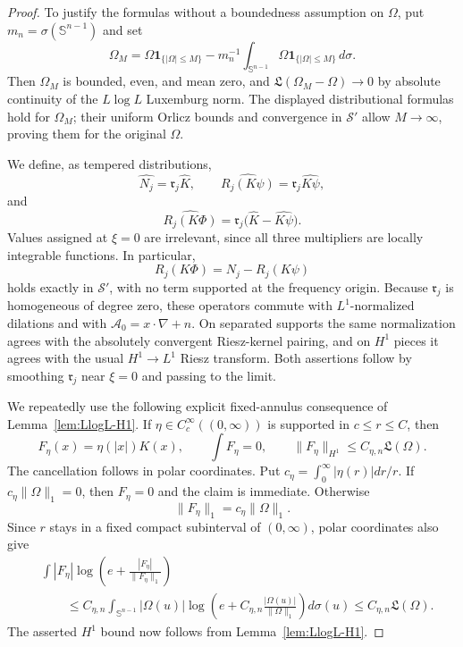\documentclass[11pt]{article}
\numberwithin{equation}{section}
\theoremstyle{remark}
\theoremstyle{definition}
\newcommand{\Sph}{\mathbb S}
\newcommand{\norm}[1]{\lVert #1\rVert}
\begin{document}
\begin{proof}
To justify the formulas without a boundedness assumption on $\Omega$, put
$m_n=\sigma(\Sph^{n-1})$ and set
\[
 \Omega_M=\Omega\mathbf1_{\{|\Omega|\le M\}}
 -m_n^{-1}\int_{\Sph^{n-1}}
       \Omega\mathbf1_{\{|\Omega|\le M\}}\,d\sigma.
\]
Then $\Omega_M$ is bounded, even, and mean zero, and
$\mathfrak L(\Omega_M-\Omega)\to0$ by absolute continuity of the
$L\log L$ Luxemburg norm.  The displayed distributional formulas hold
for $\Omega_M$; their uniform Orlicz bounds and convergence in
$\mathcal S'$ allow $M\to\infty$, proving them for the original
$\Omega$.

We define, as tempered distributions,
\[
 \widehat{N_j}=\mathfrak r_j\widehat K,\qquad
 \widehat{R_j(K\psi)}=\mathfrak r_j\widehat{K\psi},
\]
and
\[
 \widehat{R_j(K\Phi)}
 =\mathfrak r_j\bigl(\widehat K-\widehat{K\psi}\bigr).
\]
Values assigned at $\xi=0$ are irrelevant, since all three multipliers
are locally integrable functions.  In particular,
\[
 R_j(K\Phi)=N_j-R_j(K\psi)
\]
holds exactly in $\mathcal S'$, with no term supported at the frequency
origin.  Because $\mathfrak r_j$ is homogeneous of degree zero, these
operators commute with $L^1$-normalized dilations and with
$\mathcal A_0=x\cdot\nabla+n$.  On separated supports the same
normalization agrees with the absolutely convergent Riesz-kernel pairing,
and on $H^1$ pieces it agrees with the usual $H^1\to L^1$ Riesz
transform.  Both assertions follow by smoothing $\mathfrak r_j$ near
$\xi=0$ and passing to the limit.

We repeatedly use the following explicit fixed-annulus consequence
of Lemma~\ref{lem:LlogL-H1}.  If
$\eta\in C_c^\infty((0,\infty))$ is supported in $c\le r\le C$, then
\begin{equation}\label{eq:fixed-annulus-H1}
 F_\eta(x)=\eta(|x|)K(x),\qquad
 \int F_\eta=0,\qquad
 \norm{F_\eta}_{H^1}\le C_{\eta,n}\mathfrak L(\Omega).
\end{equation}
The cancellation follows in polar coordinates.  Put
$c_\eta=\int_0^\infty|\eta(r)|dr/r$.  If
$c_\eta\norm\Omega_1=0$, then $F_\eta=0$ and the claim is immediate.
Otherwise
\[
 \|F_\eta\|_1=c_\eta\|\Omega\|_1.
\]
Since $r$ stays in a fixed compact subinterval of $(0,\infty)$, polar
coordinates also give
\begin{align*}
 &\int|F_\eta|
 \log\!\left(e+\frac{|F_\eta|}{\norm{F_\eta}_1}\right)\\
 &\qquad\le C_{\eta,n}\int_{\Sph^{n-1}}|\Omega(u)|
 \log\!\left(e+C_{\eta,n}
              \frac{|\Omega(u)|}{\|\Omega\|_1}\right)d\sigma(u)
 \le C_{\eta,n}\mathfrak L(\Omega).
\end{align*}
The asserted $H^1$ bound now follows from
Lemma~\ref{lem:LlogL-H1}.


\end{proof}
\end{document}
